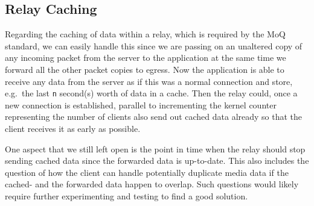 \subsection{Relay Caching}
Regarding the caching of data within a relay, which is required by the MoQ standard, we can easily
handle this since we are passing on an unaltered copy of any incoming packet from the server to the 
application at the same time we forward all the other packet copies to egress.
Now the application is able to receive any data from the server as if this was a normal connection and 
store, e.g.~the last \verb|n| second(s) worth of data in a cache.
Then the relay could, once a new connection is established, parallel to incrementing the kernel counter 
representing the number of clients also send out cached data already so that the client receives it
as early as possible.

One aspect that we still left open is the point in time when the relay should stop 
sending cached data since the forwarded data is up-to-date.
This also includes the question of how the client can handle potentially duplicate media data if the 
cached- and the forwarded data happen to overlap.
Such questions would likely require further experimenting and testing to find a good solution.
